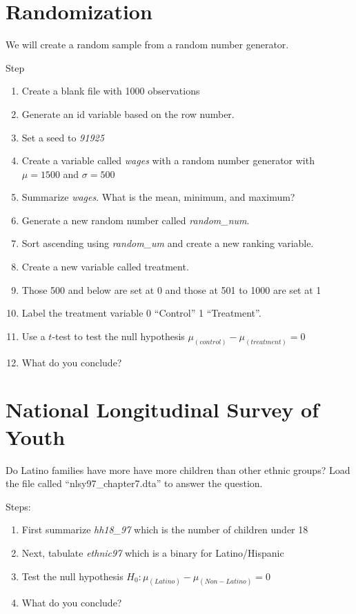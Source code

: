 \documentclass[
]{book}
\providecommand{\tightlist}{%
  \setlength{\itemsep}{0pt}\setlength{\parskip}{0pt}}
\begin{document}
\section{Randomization}\label{randomization}

We will create a random sample from a random number generator.

Step

\begin{enumerate}
\def\labelenumi{\arabic{enumi}.}
\tightlist
\item
  Create a blank file with 1000 observations
\item
  Generate an id variable based on the row number.
\item
  Set a seed to \emph{91925}
\item
  Create a variable called \emph{wages} with a random number generator with \(\mu=1500\) and \(\sigma=500\)
\item
  Summarize \emph{wages}. What is the mean, minimum, and maximum?
\item
  Generate a new random number called \emph{random\_num}.
\item
  Sort ascending using \emph{random\_um} and create a new ranking variable.
\item
  Create a new variable called treatment.
\item
  Those 500 and below are set at 0 and those at 501 to 1000 are set at 1
\item
  Label the treatment variable 0 ``Control'' 1 ``Treatment''.
\item
  Use a \(t\)-test to test the null hypothesis \(\mu_{(control)}-\mu_{(treatment)}=0\)
\item
  What do you conclude?
\end{enumerate}

\section{National Longitudinal Survey of Youth}\label{national-longitudinal-survey-of-youth}

Do Latino families have more have more children than other ethnic groups? Load the file called ``nlsy97\_chapter7.dta'' to answer the question.

Steps:

\begin{enumerate}
\def\labelenumi{\arabic{enumi}.}
\tightlist
\item
  First summarize \emph{hh18\_97} which is the number of children under 18
\item
  Next, tabulate \emph{ethnic97} which is a binary for Latino/Hispanic
\item
  Test the null hypothesis \(H_{0}: \mu_{(Latino)}-\mu_{(Non-Latino)}=0\)
\item
  What do you conclude?
\end{enumerate}
\end{document}
